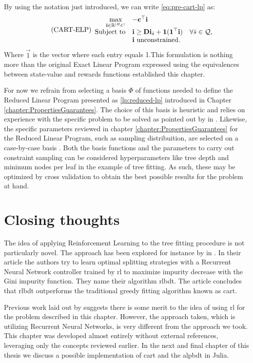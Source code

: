 By using the notation just introduced, we can write \eqref{eq:pre-cart-lp} as:
\begin{equation}
\tag{CART-ELP}
\label{lp:cart-elp}
\begin{array}{rl@{}ll}
    \displaystyle \max_{\vec{i} \in \R^{|B_\L|}} & - \vec{c}^{\top} \vec{i} \\
    \text{Subject to} & \displaystyle \vec{i} \geq \vec{Di}_{\bar{s}} + \vec{1} (\vec{1}^{\top} \vec{i}) & \quad \forall \bar{s} \in \mathcal{Q}, \\
    & \vec{i} \text{ unconstrained.} &
\end{array}
\end{equation}
Where $\vec{1}$ is the vector where each entry equals 1.This formulation is
nothing more than the original Exact Linear Program expressed using the
equivalences between state-value and rewards functions established this chapter.

For now we refrain from selecting a basis $\Phi$ of functions needed to define
the Reduced Linear Program presented as \ref{lp:reduced-lp} introduced in
Chapter \ref{chapter:PropertiesGuarantees}. The choice of this basis is
heuristic and relies on experience with the specific problem to be solved as
pointed out by \citeauthor{farias2003LP2ADP} in \cite{farias2003LP2ADP}.
Likewise, the specific parameters reviewed in chapter
\ref{chapter:PropertiesGuarantees} for the Reduced Linear Program, such as
sampling distribuition, are selected on a case-by-case basis
\cite{farias2004constraint}. Both the basis functions and the parameters to
carry out constraint sampling can be considered hyperparameters like tree depth
and minimum nodes per leaf in the example of tree fitting. As such, these may be
optimized by cross validation \cite[Ch.~2.1]{intro2statslearning} to obtain the
best possible results for the problem at hand.  

\section{Closing thoughts}

The idea of applying Reinforcement Learning to the tree fitting procedure is not
particularly novel. The approach has been explored for instance by
\citeauthor{xiong} in \cite{xiong}. In their article the authors try to learn
optimal splitting strategies with a Recurrent Neural Network controller trained
by \ac{rl} to maximize impurity decrease with the Gini impurity function. They
name their algorithm \ac{rlbdt}. The article concludes that \ac{rlbdt}
outperforms the traditional greedy fitting algorithm known as \ac{cart}.

Previous work laid out by \citeauthor{xiong} suggests there is some merit to the
idea of using \ac{rl} for the problem described in this chapter. However, the
approach taken, which is utilizing Recurrent Neural Networks, is very different
from the approach we took. This chapter was developed almost entirely without
external references, leveraging only the concepts reviewed earlier. In the next
and final chapter of this thesis we discuss a possible implementation of
\ac{cart} and the \ac{alpbdt} in Julia.